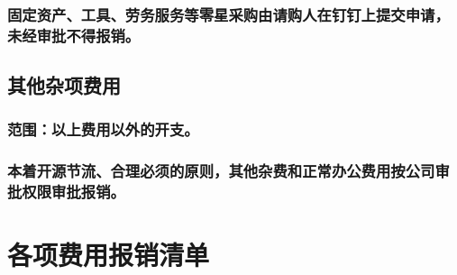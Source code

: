 \documentclass[16pt]{article}
\begin{document}
\subsubsection{固定资产、工具、劳务服务等零星采购由请购人在钉钉上提交申请，未经审批不得报销。}

\subsection{其他杂项费用}

\subsubsection{范围：以上费用以外的开支。}
\subsubsection{本着开源节流、合理必须的原则，其他杂费和正常办公费用按公司审批权限审批报销。}

\section{各项费用报销清单}
\end{document}
